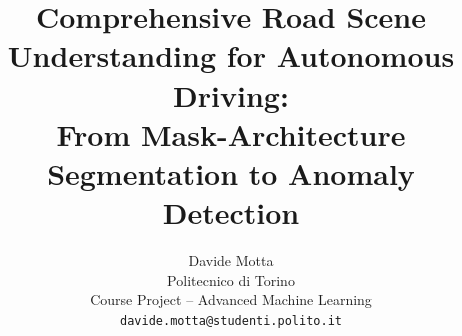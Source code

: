 \documentclass[10pt,twocolumn,letterpaper]{article}
\title{Comprehensive Road Scene Understanding for Autonomous Driving:\\
From Mask-Architecture Segmentation to Anomaly Detection}
\author{Davide Motta\\
Politecnico di Torino\\
Course Project -- Advanced Machine Learning\\
{\tt\small davide.motta@studenti.polito.it}
}
\begin{document}
\maketitle








{
    \small
    
    
}
\end{document}

